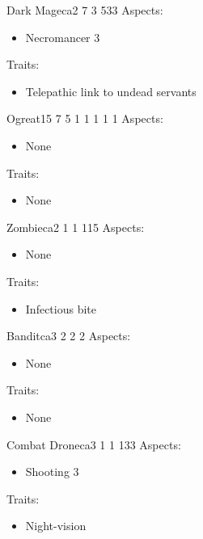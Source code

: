 \documentclass[11pt]{article}
\begin{document}
{\begin{npc}{Dark Mage}{ca}{2 7 3 5}{33}
Aspects:
\begin{itemize}
\item Necromancer 3
\end{itemize}
\columnbreak
Traits:
\begin{itemize}
\item Telepathic link to undead servants
\end{itemize}
\end{npc}

\begin{npc}{Ogre}{at}{15 7 5 1 1 1 1 1}{}
Aspects:
\begin{itemize}
\item None
\end{itemize}
Traits:
\begin{itemize}
\item None
\end{itemize}
\end{npc}

\begin{npc}{Zombie}{ca}{2 1 1 1}{15}
Aspects:
\begin{itemize}
\item None
\end{itemize}
Traits:
\begin{itemize}
\item Infectious bite
\end{itemize}
\end{npc}

\begin{npc}{Bandit}{ca}{3 2 2 2}{}
Aspects:
\begin{itemize}
\item None
\end{itemize}
Traits:
\begin{itemize}
\item None
\end{itemize}
\end{npc}

\begin{npc}{Combat Drone}{ca}{3 1 1 1}{33}
Aspects:
\begin{itemize}
\item Shooting 3
\end{itemize}
Traits:
\begin{itemize}
\item Night-vision
\end{itemize}
\end{npc}

}
\end{document}
